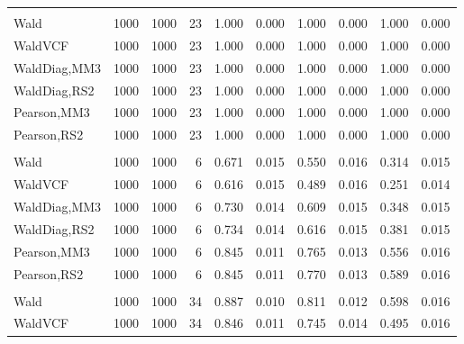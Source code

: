 \documentclass[
]{article}
\begin{document}
\begin{table}[H]
{\begin{tabular}[t]{lrrrrrrlrr}
\addlinespace[0.3em]
\multicolumn{10}{l}{\textbf{1F 15V}}\\
\hspace{1em}Wald & 1000 & 1000 & 23 & 1.000 & 0.000 & 1.000 & 0.000 & 1.000 & 0.000\\
\hspace{1em}WaldVCF & 1000 & 1000 & 23 & 1.000 & 0.000 & 1.000 & 0.000 & 1.000 & 0.000\\
\hspace{1em}WaldDiag,MM3 & 1000 & 1000 & 23 & 1.000 & 0.000 & 1.000 & 0.000 & 1.000 & 0.000\\
\hspace{1em}WaldDiag,RS2 & 1000 & 1000 & 23 & 1.000 & 0.000 & 1.000 & 0.000 & 1.000 & 0.000\\
\hspace{1em}Pearson,MM3 & 1000 & 1000 & 23 & 1.000 & 0.000 & 1.000 & 0.000 & 1.000 & 0.000\\
\hspace{1em}Pearson,RS2 & 1000 & 1000 & 23 & 1.000 & 0.000 & 1.000 & 0.000 & 1.000 & 0.000\\
\addlinespace[0.3em]
\multicolumn{10}{l}{\textbf{2F 10V}}\\
\hspace{1em}Wald & 1000 & 1000 & 6 & 0.671 & 0.015 & 0.550 & 0.016 & 0.314 & 0.015\\
\hspace{1em}WaldVCF & 1000 & 1000 & 6 & 0.616 & 0.015 & 0.489 & 0.016 & 0.251 & 0.014\\
\hspace{1em}WaldDiag,MM3 & 1000 & 1000 & 6 & 0.730 & 0.014 & 0.609 & 0.015 & 0.348 & 0.015\\
\hspace{1em}WaldDiag,RS2 & 1000 & 1000 & 6 & 0.734 & 0.014 & 0.616 & 0.015 & 0.381 & 0.015\\
\hspace{1em}Pearson,MM3 & 1000 & 1000 & 6 & 0.845 & 0.011 & 0.765 & 0.013 & 0.556 & 0.016\\
\hspace{1em}Pearson,RS2 & 1000 & 1000 & 6 & 0.845 & 0.011 & 0.770 & 0.013 & 0.589 & 0.016\\
\addlinespace[0.3em]
\multicolumn{10}{l}{\textbf{3F 15V}}\\
\hspace{1em}Wald & 1000 & 1000 & 34 & 0.887 & 0.010 & 0.811 & 0.012 & 0.598 & 0.016\\
\hspace{1em}WaldVCF & 1000 & 1000 & 34 & 0.846 & 0.011 & 0.745 & 0.014 & 0.495 & 0.016\\

\end{tabular}}
\end{table}
\end{document}
